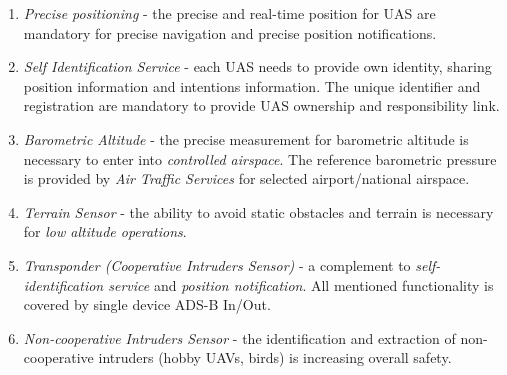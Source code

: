 \begin{enumerate}
    \item \emph{Precise positioning} - the precise and real-time position for UAS are mandatory for precise navigation and precise position notifications. 
    
    \item \emph{Self Identification Service} - each UAS needs to provide own identity, sharing position information and intentions information. The unique identifier and registration are mandatory to provide UAS ownership and responsibility link.
    
    \item \emph{Barometric Altitude} - the precise measurement for barometric altitude is necessary to enter into \emph{controlled airspace}. The reference barometric pressure is provided by \emph{Air Traffic Services} for selected airport/national airspace.
    
    \item \emph{Terrain Sensor} - the ability to avoid static obstacles and terrain is necessary for \emph{low altitude operations}.
    
    \item \emph{Transponder (Cooperative Intruders Sensor)} - a complement to \emph{self-identification service} and \emph{position notification}. All mentioned functionality is covered by single device ADS-B In/Out.
    
    \item \emph{Non-cooperative Intruders Sensor} - the identification and extraction of non-cooperative intruders (hobby UAVs, birds) is increasing overall safety.
\end{enumerate}

